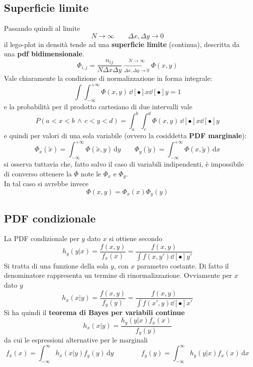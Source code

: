 \documentclass[10pt, oneside]{book}
\newcommand{\integral}[4]{\int_{#1}^{#2} #3 \, \mathrm{d}#4}
\begin{document}
\subsection{Superficie limite}
Passando quindi al limite
\[N \rightarrow \infty \qquad \Delta x, \Delta y \rightarrow 0\]
il lego-plot in densità tende ad una \textbf{superficie limite} (continua), descritta da una \textbf{pdf bidimensionale}.
\[\Phi_{i,j} = \frac{n_{ij}}{N \Delta x \Delta y} \xrightarrow[\Delta x, \Delta y \rightarrow 0]{N \rightarrow \infty} \Phi(x,y)\]
Vale chiaramente la condizione di normalizzazione in forma integrale:
\[\int \int_{-\infty}^{+\infty} \Phi(x,y) \, \dd[•]{x} \dd[•]{y} = 1\]
e la probabilità per il prodotto cartesiano di due intervalli vale
\[P(a < x < b \, \land \, c < y < d) = \int_a^b \int_c^d \Phi(x,y) \, \dd[•]{x} \dd[•]{y}\]
e quindi per valori di una sola variabile (ovvero la cosiddetta \textbf{PDF marginale}):
\[\Phi_x(\tilde{x}) = \int_{-\infty}^{+\infty} \Phi(\tilde{x}, y) \, \mathrm{d}y \qquad \Phi_y(\tilde{y}) =  \int_{-\infty}^{+\infty} \Phi(x, \tilde{y}) \, \mathrm{d}x\]
si osserva tuttavia che, fatto salvo il caso di variabili indipendenti, è impossibile di converso ottenere la $\Phi$ note le $\Phi_x$ e $\Phi_y$.\\
In tal caso si avrebbe invece
\[\Phi(x,y) = \Phi_x(x) \Phi_y (y)\]

\subsection{PDF condizionale}
La PDF condizionale per $y$ dato $x$ si ottiene secondo
\[h_y(y|x) = \frac{f(x,y)}{f_x(x)} = \frac{f(x,y)}{\int f(x, y') \dd[•]{y'}}\]
Si tratta di una funzione della sola $y$, con $x$ parametro costante. Di fatto il denominatore rappresenta un termine di rinormalizzazione. Ovviamente per $x$ dato $y$
\[h_x(x|y) = \frac{f(x,y)}{f_y(y)} = \frac{f(x,y)}{\int f(x', y) \dd[•]{x'}}\]
Si ha quindi il \textbf{teorema di Bayes per variabili continue}
\[h_x(x|y) = \frac{h_y(y|x) f_x(x)}{f_y(y)}\]
da cui le espressioni alternative per le marginali
\[f_x(x) = \integral{-\infty}{\infty}{h_x(x|y)f_y(y)}{y} \qquad \qquad f_y(y) = \integral{-\infty}{\infty}{h_y(y|x)f_x(x)}{x}\]
\end{document}
